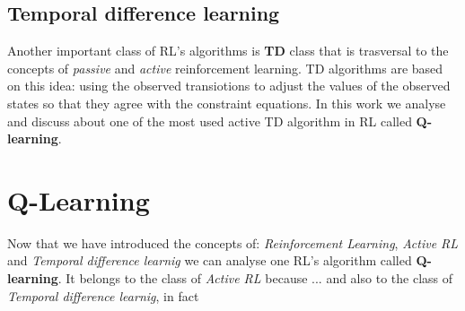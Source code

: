 \documentclass[]{report}
\begin{document}
\section{Temporal difference learning}
Another important class of RL's algorithms is \textbf{TD} class that is trasversal to the concepts of \emph{passive} and \emph{active} reinforcement learning.
TD algorithms are based on this idea: using the observed transiotions to adjust the values of the observed states so that they agree with the constraint equations.
In this work we analyse and discuss about one of the most used active TD algorithm in RL called \textbf{Q-learning}.

\chapter{Q-Learning}

Now that we have introduced the concepts of: \emph{Reinforcement Learning}, \emph{Active RL} and \emph{Temporal difference learnig} we can analyse one RL's algorithm called \textbf{Q-learning}.
It belongs to the class of \emph{Active RL} because ... and also to the class of \emph{Temporal difference learnig}, in fact
\end{document}
